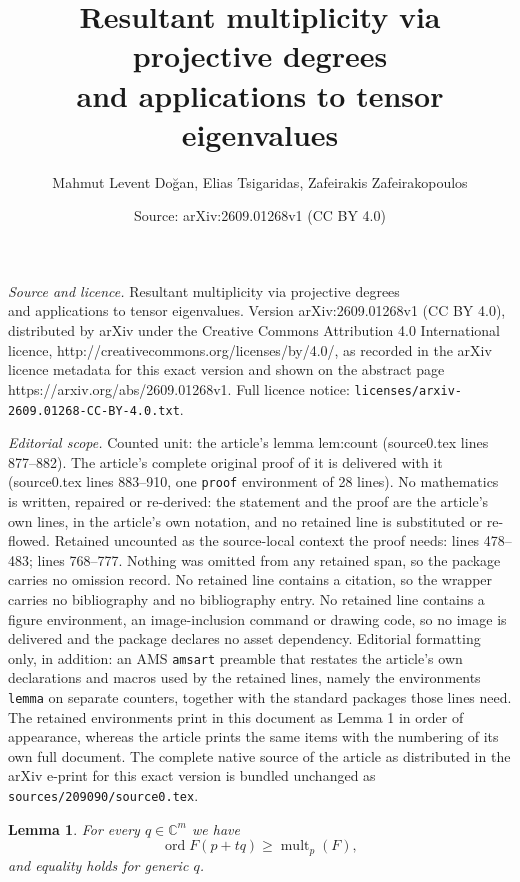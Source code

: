 \documentclass[10pt,a4paper]{amsart}
\title{Resultant multiplicity via projective degrees\\ and applications to tensor eigenvalues}
\author{Mahmut Levent Do\u{g}an, Elias Tsigaridas, Zafeirakis Zafeirakopoulos}
\date{Source: arXiv:2609.01268v1 (CC BY 4.0)}
\newtheorem{lemma}{Lemma}
\newcommand{\CC}{\mathbb{C}}
\DeclareMathOperator{\mult}{mult}
\begin{document}
\maketitle

\noindent\emph{Source and licence.} Resultant multiplicity via projective degrees\\ and applications to tensor eigenvalues. Version arXiv:2609.01268v1 (CC BY 4.0), distributed by arXiv under the Creative Commons Attribution 4.0 International licence, http://creativecommons.org/licenses/by/4.0/, as recorded in the arXiv licence metadata for this exact version and shown on the abstract page https://arxiv.org/abs/2609.01268v1. Full licence notice: \texttt{licenses/arxiv-2609.01268-CC-BY-4.0.txt}.\par\smallskip

\noindent\textit{Editorial scope.} Counted unit: the article's lemma lem:count (source0.tex lines 877--882). The article's complete original proof of it is delivered with it (source0.tex lines 883--910, one \texttt{proof} environment of 28 lines). No mathematics is written, repaired or re-derived: the statement and the proof are the article's own lines, in the article's own notation, and no retained line is substituted or re-flowed.  Retained uncounted as the source-local context the proof needs: lines 478--483; lines 768--777.  Nothing was omitted from any retained span, so the package carries no omission record.  No retained line contains a citation, so the wrapper carries no bibliography and no bibliography entry.  No retained line contains a figure environment, an image-inclusion command or drawing code, so no image is delivered and the package declares no asset dependency.  Editorial formatting only, in addition: an AMS \texttt{amsart} preamble that restates the article's own declarations and macros used by the retained lines, namely the environments \texttt{lemma} on separate counters, together with the standard packages those lines need.  The retained environments print in this document as Lemma 1 in order of appearance, whereas the article prints the same items with the numbering of its own full document.  The complete native source of the article as distributed in the arXiv e-print for this exact version is bundled unchanged as \texttt{sources/209090/source0.tex}.
\begin{lemma}
\label{lem:generic-line}
    For every $q\in\CC^m$ we have \[
    \operatorname{ord} F(p+tq) \geq \mult_{p}(F),
    \] and equality holds for generic $q$.
\end{lemma}
\end{document}
